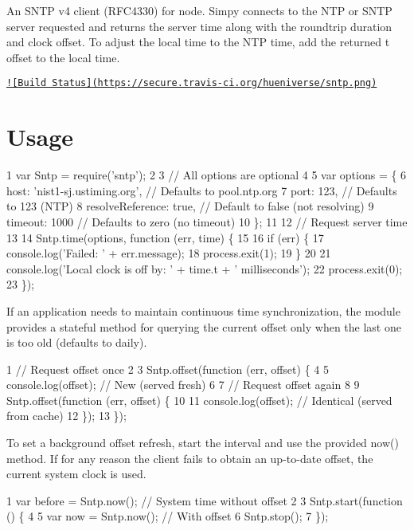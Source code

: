 An S\+N\+T\+P v4 client (R\+F\+C4330) for node. Simpy connects to the N\+T\+P or S\+N\+T\+P server requested and returns the server time along with the roundtrip duration and clock offset. To adjust the local time to the N\+T\+P time, add the returned {\ttfamily t} offset to the local time.

\href{http://travis-ci.org/hueniverse/sntp}{\tt !\mbox{[}Build Status\mbox{]}(https\+://secure.\+travis-\/ci.\+org/hueniverse/sntp.\+png)}

\section*{Usage}


\begin{DoxyCode}
1 var Sntp = require('sntp');
2 
3 // All options are optional
4 
5 var options = \{
6     host: 'nist1-sj.ustiming.org',  // Defaults to pool.ntp.org
7     port: 123,                      // Defaults to 123 (NTP)
8     resolveReference: true,         // Default to false (not resolving)
9     timeout: 1000                   // Defaults to zero (no timeout)
10 \};
11 
12 // Request server time
13 
14 Sntp.time(options, function (err, time) \{
15 
16     if (err) \{
17         console.log('Failed: ' + err.message);
18         process.exit(1);
19     \}
20 
21     console.log('Local clock is off by: ' + time.t + ' milliseconds');
22     process.exit(0);
23 \});
\end{DoxyCode}


If an application needs to maintain continuous time synchronization, the module provides a stateful method for querying the current offset only when the last one is too old (defaults to daily).


\begin{DoxyCode}
1 // Request offset once
2 
3 Sntp.offset(function (err, offset) \{
4 
5     console.log(offset);                    // New (served fresh)
6 
7     // Request offset again
8 
9     Sntp.offset(function (err, offset) \{
10 
11         console.log(offset);                // Identical (served from cache)
12     \});
13 \});
\end{DoxyCode}


To set a background offset refresh, start the interval and use the provided now() method. If for any reason the client fails to obtain an up-\/to-\/date offset, the current system clock is used.


\begin{DoxyCode}
1 var before = Sntp.now();                    // System time without offset
2 
3 Sntp.start(function () \{
4 
5     var now = Sntp.now();                   // With offset
6     Sntp.stop();
7 \});
\end{DoxyCode}
 